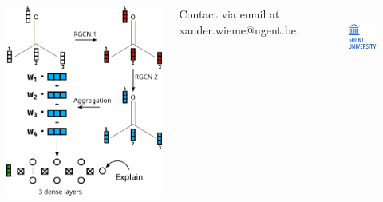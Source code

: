 \documentclass[14pt, a2paper, portrait]{tikzposter}
\begin{document}
\begin{columns}
{        \begin{tikzfigure}
            \includegraphics[scale=5]{../data/images/RGCN_model.png}
        \end{tikzfigure}

    }


	 {
		Contact via email at xander.wieme@ugent.be. \\
		\begin{figure}
			\vspace{-2.7cm}
			\begin{tikzfigure}[]
				\includegraphics[height=2cm]{figures/ugent_logo}
			\end{tikzfigure}
		\end{figure}
	}


\end{columns}
\end{document}
